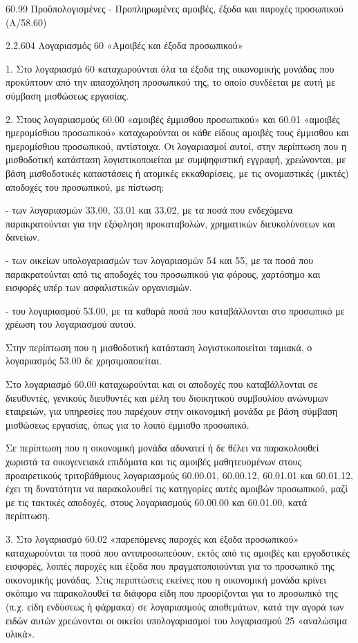 \documentclass[A4,10pt,greek]{book}
\begin{document}
        60.99   Προϋπολογισμένες - Προπληρωμένες αμοιβές, έξοδα και παροχές
                     προσωπικού (Λ/58.60)

 

 

2.2.604 Λογαριασμός 60 «Αμοιβές και έξοδα προσωπικού»

1. Στο λογαριασμό 60 καταχωρούνται όλα τα έξοδα της οικονομικής μονάδας που προκύπτουν από την απασχόληση προσωπικού της, το οποίο συνδέεται με αυτή με σύμβαση μισθώσεως εργασίας.

2. Στους λογαριασμούς 60.00 «αμοιβές έμμισθου προσωπικού» και 60.01 «αμοιβές ημερομίσθιου προσωπικού» καταχωρούνται οι κάθε είδους αμοιβές τους έμμισθου και ημερομίσθιου προσωπικού, αντίστοιχα. Οι λογαριασμοί αυτοί, στην περίπτωση που η μισθοδοτική κατάσταση λογιστικοποιείται με συμψηφιστική εγγραφή, χρεώνονται, με βάση μισθοδοτικές καταστάσεις ή ατομικές εκκαθαρίσεις, με τις ονομαστικές (μικτές) αποδοχές του προσωπικού, με πίστωση:

- των λογαριασμών 33.00, 33.01 και 33.02, με τα ποσά που ενδεχόμενα παρακρατούνται για την εξόφληση προκαταβολών, χρηματικών διευκολύνσεων και δανείων.

- των οικείων υπολογαριασμών των λογαριασμών 54 και 55, με τα ποσά που παρακρατούνται από τις αποδοχές του προσωπικού για φόρους, χαρτόσημο και εισφορές υπέρ των ασφαλιστικών οργανισμών.

- του λογαριασμού 53.00, με τα καθαρά ποσά που καταβάλλονται στο προσωπικό με χρέωση του λογαριασμού αυτού.

Στην περίπτωση που η μισθοδοτική κατάσταση λογιστικοποιείται ταμιακά, ο λογαριασμός 53.00 δε χρησιμοποιείται.

Στο λογαριασμό 60.00 καταχωρούνται και οι αποδοχές που καταβάλλονται σε διευθυντές, γενικούς διευθυντές και μέλη του διοικητικού συμβουλίου ανώνυμων εταιρειών, για υπηρεσίες που παρέχουν στην οικονομική μονάδα με βάση σύμβαση μισθώσεως εργασίας, όπως για το λοιπό έμμισθο προσωπικό.

Σε περίπτωση που η οικονομική μονάδα αδυνατεί ή δε θέλει να παρακολουθεί χωριστά τα οικογενειακά επιδόματα και τις αμοιβές μαθητευομένων στους προαιρετικούς τριτοβάθμιους λογαριασμούς 60.00.01, 60.00.12, 60.01.01 και 60.01.12, έχει τη δυνατότητα να παρακολουθεί τις κατηγορίες αυτές αμοιβών προσωπικού, μαζί με τις τακτικές αποδοχές, στους λογαριασμούς 60.00.00 και 60.01.00, κατά περίπτωση.

3. Στο λογαριασμό 60.02 «παρεπόμενες παροχές και έξοδα προσωπικού» καταχωρούνται τα ποσά που αντιπροσωπεύουν, εκτός από τις αμοιβές και εργοδοτικές εισφορές, λοιπές παροχές και έξοδα που πραγματοποιούνται για το προσωπικό της οικονομικής μονάδας. Στις περιπτώσεις εκείνες που η οικονομική μονάδα κρίνει σκόπιμο να παρακολουθεί τα διάφορα είδη που προορίζονται για το προσωπικό της (π.χ. είδη ενδύσεως ή φάρμακα) σε λογαριασμούς αποθεμάτων, κατά την αγορά των ειδών αυτών χρεώνονται οι οικείοι υπολογαριασμοί του λογαριασμού 25 «αναλώσιμα υλικά».
\end{document}
